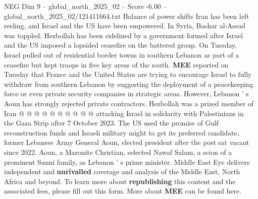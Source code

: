 \begin{textsample}{NEG Dim 9 – global\_north\_2025\_02 – Score -6.00 – global\_north\_2025\_02/121411664.txt}
Balance of power shifts Iran has been left reeling, and Israel and the US have been empowered.
In Syria, Bashar al-Assad was toppled.
Hezbollah has been sidelined by a government formed after Israel and the US imposed a lopsided ceasefire on the battered group.
On Tuesday, Israel pulled out of residential border towns in southern Lebanon as part of a ceasefire but kept troops in five key areas of the south. \textbf{MEE} reported on Tuesday that France and the United States are trying to encourage Israel to fully withdraw from southern Lebanon by suggesting the deployment of a peacekeeping force or even private security companies in strategic areas.
However, Lebanon ' s Aoun has strongly rejected private contractors.
Hezbollah was a prized member of Iran @ @ @ @ @ @ @ @ @ @ attacking Israel in solidarity with Palestinians in the Gaza Strip after 7 October 2023.
The US used the promise of Gulf reconstruction funds and Israeli military might to get its preferred candidate, former Lebanese Army General Aoun, elected president after the post sat vacant since 2022.
Aoun, a Maronite Christian, selected Nawaf Salam, a scion of a prominent Sunni family, as Lebanon ' s prime minister.
Middle East Eye delivers independent and \textbf{unrivalled} coverage and analysis of the Middle East, North Africa and beyond.
To learn more about \textbf{republishing} this content and the associated fees, please fill out this form.
More about \textbf{MEE} can be found here.

\end{textsample}
